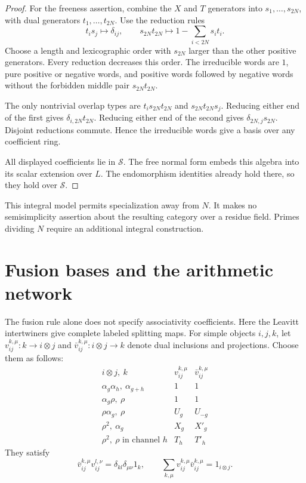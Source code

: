 \begin{proof}
For the freeness assertion, combine the \(X\) and \(T\) generators
into \(s_1,\ldots,s_{2N}\), with dual generators
\(t_1,\ldots,t_{2N}\).
Use the reduction rules
\[
 t_i s_j\longmapsto\delta_{ij},\qquad
 s_{2N}t_{2N}\longmapsto
       1-\sum_{i<2N}s_it_i.
\]
Choose a length and lexicographic order with \(s_{2N}\)
larger than the other positive generators.
Every reduction decreases this order.
The irreducible words are \(1\), pure positive or negative words,
and positive words followed by negative words without the
forbidden middle pair \(s_{2N}t_{2N}\).

The only nontrivial overlap types are
\(t_i s_{2N}t_{2N}\) and \(s_{2N}t_{2N}s_j\).
Reducing either end of the first gives
\(\delta_{i,2N}t_{2N}\).
Reducing either end of the second gives
\(\delta_{2N,j}s_{2N}\).
Disjoint reductions commute. Hence the irreducible words give a
basis over any coefficient ring.

All displayed coefficients lie in \(\mathcal S\).
The free normal form embeds this algebra into its scalar extension
over \(L\). The endomorphism identities already hold there,
so they hold over \(\mathcal S\).
\end{proof}

This integral model permits specialization away from \(N\).
It makes no semisimplicity assertion about the resulting category
over a residue field. Primes dividing \(N\) require an additional
integral construction.

\section{Fusion bases and the arithmetic network}
\label{v4-arith:mf:network-section}

The fusion rule alone does not specify associativity coefficients.
Here the Leavitt intertwiners give complete labeled splitting maps.
For simple objects \(i,j,k\), let
\(v_{ij}^{k,\mu}:k\to i\otimes j\) and
\(\bar v_{ij}^{k,\mu}:i\otimes j\to k\)
denote dual inclusions and projections.
Choose them as follows:
\[
\begin{array}{c|c|c}
 i\otimes j,\ k&v_{ij}^{k,\mu}&\bar v_{ij}^{k,\mu}\\ \hline
 \alpha_g\alpha_h,\ \alpha_{g+h}&1&1\\
 \alpha_g\rho,\ \rho&1&1\\
 \rho\alpha_g,\ \rho&U_g&U_{-g}\\
 \rho^2,\ \alpha_g&X_g&X'_g\\
 \rho^2,\ \rho\text{ in channel }h&T_h&T'_h
\end{array}
\]
They satisfy
\[
 \bar v_{ij}^{k,\mu}v_{ij}^{l,\nu}
       =\delta_{kl}\delta_{\mu\nu}1_k,\qquad
 \sum_{k,\mu}v_{ij}^{k,\mu}\bar v_{ij}^{k,\mu}
       =1_{i\otimes j}.
\]

